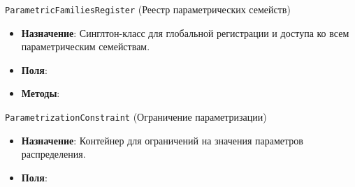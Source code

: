 \noindent \texttt{ParametricFamiliesRegister} (Реестр параметрических семейств)
\begin{itemize}[noitemsep, topsep=0pt, parsep=0pt]
    \item \textbf{Назначение}: Синглтон-класс для глобальной регистрации и доступа ко всем параметрическим семействам.\item \textbf{Поля}:
    \item \textbf{Методы}:
\end{itemize}

\noindent \texttt{ParametrizationConstraint} (Ограничение параметризации)
\begin{itemize}[noitemsep, topsep=0pt, parsep=0pt]
    \item \textbf{Назначение}: Контейнер для ограничений на значения параметров распределения.

    \item \textbf{Поля}:
\end{itemize}

